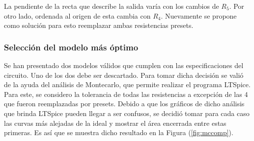 \documentclass[a4paper]{article}
\begin{document}
La pendiente de la recta que describe la salida varía con los cambios de $R_5$. Por otro lado, ordenada al origen de esta cambia con $R_4$. Nuevamente se propone como solución para esto reemplazar ambas resistencias presets.

\subsubsection{Selección del modelo más óptimo}

Se han presentado dos modelos válidos que cumplen con las especificaciones del circuito. Uno de los dos debe ser descartado. Para tomar dicha decisión se valió de la ayuda del análisis de Montecarlo, que permite realizar el programa LTSpice. Para este, se considero la tolerancia de todas las resistencias a excepción de las 4 que fueron reemplazadas por presets. Debido a que los gráficos de dicho análisis que brinda LTSpice pueden llegar a ser confusos, se decidió tomar para cada caso las curvas más alejadas de la ideal y mostrar el área encerrada entre estas primeras. Es así que se muestra dicho resultado en la Figura (\ref{fig:mccomp}). 
\end{document}
